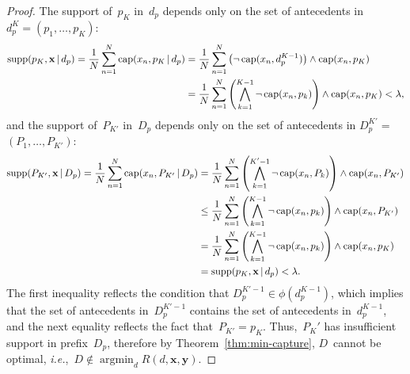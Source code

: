 \documentclass[twoside,11pt]{article}
\def\ie{{\it i.e.},~}
\newcommand{\x}{\mathbf{x}}
\newcommand{\y}{\mathbf{y}}
\def\RL{{d}}
\def\Prefix{d_p}
\def\RLB{{D}}
\def\PrefixB{D_p}
\def\Obj{R}
\def\Reg{{\lambda}}
\def\Cap{\textnormal{cap}}
\def\Supp{\textnormal{supp}}
\def\StartContains{\phi}
\DeclareMathOperator*{\argmin}{argmin}
\newcommand{\nn}{\nonumber}
\newcommand{\given}{\,|\,}
\begin{document}
\begin{arxiv}
\begin{proof}
The support of~$p_K$ in~$\Prefix$ depends only on the
set of antecedents in ${\Prefix^{K} = (p_1, \dots, p_{K})}$:
\begin{align}
\Supp(p_K, \x \given \Prefix)
= \frac{1}{N} \sum_{n=1}^N \Cap(x_n, p_K \given \Prefix)
&= \frac{1}{N} \sum_{n=1}^N \left( \neg\, \Cap(x_n, \Prefix^{K-1}) \right)
  \wedge \Cap(x_n, p_K) \nn \\
&= \frac{1}{N} \sum_{n=1}^N \left( \bigwedge_{k=1}^{K-1} \neg\, \Cap(x_n, p_k) \right)
  \wedge \Cap(x_n, p_K)
< \Reg, \nn
\end{align}
and the support of~$P_{K'}$ in~$\PrefixB$ depends only on
the set of antecedents in ${\PrefixB^{K'} =}$ ${(P_1, \dots, P_{K'})}$:
\begin{align}
\Supp(P_{K'}, \x \given \PrefixB)
= \frac{1}{N} \sum_{n=1}^N \Cap(x_n, P_{K'} \given \PrefixB) %
&= \frac{1}{N} \sum_{n=1}^N \left( \bigwedge_{k=1}^{K'-1} \neg\, \Cap(x_n, P_k) \right)
   \wedge \Cap(x_n, P_{K'}) \nn \\
&\le \frac{1}{N} \sum_{n=1}^N \left( \bigwedge_{k=1}^{K-1} \neg\, \Cap(x_n, p_k) \right)
  \wedge \Cap(x_n, P_{K'}) \nn \\
&= \frac{1}{N} \sum_{n=1}^N \left( \bigwedge_{k=1}^{K-1} \neg\, \Cap(x_n, p_k) \right)
  \wedge \Cap(x_n, p_{K}) \nn \\
&= \Supp(p_K, \x \given \Prefix) < \Reg.
\label{ineq:supp}
\end{align}
The first inequality reflects the condition that
${\PrefixB^{K'-1} \in \StartContains(\Prefix^{K-1})}$,
which implies that the set of antecedents in~$\PrefixB^{K'-1}$
contains the set of antecedents in~$\Prefix^{K-1}$,
and the next equality reflects the fact that~${P_{K'} = p_K}$.
%
Thus,~$P_K'$ has insufficient support in prefix~$\PrefixB$,
therefore by Theorem~\ref{thm:min-capture}, $\RLB$~cannot be optimal,
\ie ${\RLB \notin \argmin_{\RL} \Obj(\RL, \x, \y)}$.
\end{proof}


\end{arxiv}
\end{document}
